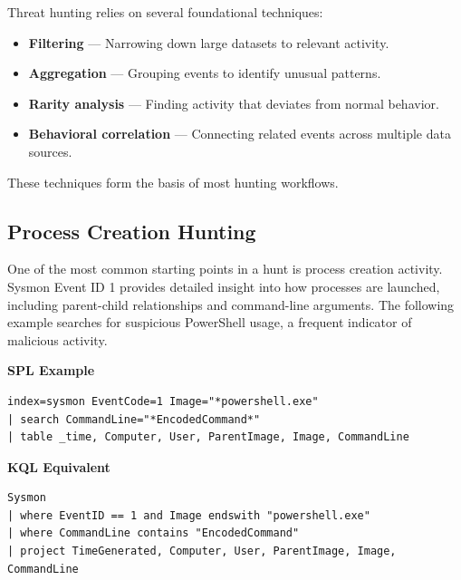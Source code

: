 Threat hunting relies on several foundational techniques:

\begin{itemize}
    \item \textbf{Filtering} — Narrowing down large datasets to relevant activity.
    \item \textbf{Aggregation} — Grouping events to identify unusual patterns.
    \item \textbf{Rarity analysis} — Finding activity that deviates from normal behavior.
    \item \textbf{Behavioral correlation} — Connecting related events across multiple data sources.
\end{itemize}

These techniques form the basis of most hunting workflows.


\subsection*{Process Creation Hunting}

One of the most common starting points in a hunt is process creation activity. Sysmon Event ID 1 provides detailed 
insight into how processes are launched, including parent-child relationships and command-line arguments. The 
following example searches for suspicious PowerShell usage, a frequent indicator of malicious activity.

\textbf{SPL Example}

\begin{lstlisting}
index=sysmon EventCode=1 Image="*powershell.exe"
| search CommandLine="*EncodedCommand*"
| table _time, Computer, User, ParentImage, Image, CommandLine
\end{lstlisting}

\textbf{KQL Equivalent}

\begin{lstlisting}
Sysmon
| where EventID == 1 and Image endswith "powershell.exe"
| where CommandLine contains "EncodedCommand"
| project TimeGenerated, Computer, User, ParentImage, Image, CommandLine
\end{lstlisting}


